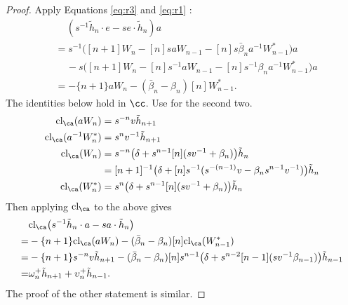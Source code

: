 \begin{proof}
Apply Equations \eqref{eq:r3} and \eqref{eq:r1} :
\begin{align*}
& \quad \, ( s^{-1} \tilde{h}_n \cdot e - s e \cdot \tilde{h}_n ) a \\
&=  s^{-1} \big( [n+1] W_n - [n] s a W_{n-1} - [n] s \bar{\beta}_n a^{-1} W^*_{n-1} \big) a \\
&\quad \, - s \big( [n+1] W_n - [n] s^{-1} a W_{n-1} - [n] s^{-1} \beta_n a^{-1} W^*_{n-1} \big) a \\
&= - \{n+1\} a W_n - ( \bar{\beta}_n - \beta_n ) [n] W^*_{n-1}.
\end{align*}
The identities below hold in $\cc$. Use \cite[Lemma 21]{She16} for the second two.
\begin{align*}
\textrm{cl}_\ca ( a W_n ) &= s^{-n} v \tilde{h}_{n+1} \\
\textrm{cl}_\ca ( a^{-1} W^*_n ) &= s^n v^{-1} \tilde{h}_{n+1} \\
\textrm{cl}_\ca ( W_n ) &= s^{-n} \big( \delta + s^{n-1} [n] ( s v^{-1} + \beta_n ) \big) \tilde{h}_n \\
&= [n+1]^{-1} \big( \delta + [n]s^{-1} ( s^{-(n-1)} v - \beta_n s^{n-1} v^{-1} ) \big) \tilde{h}_n \\
\textrm{cl}_\ca ( W^*_n ) &= s^n \big( \delta + s^{n-1} [n] ( s v^{-1} + \beta_n ) \big) \tilde{h}_n
\end{align*}
Then applying $\textrm{cl}_\ca$ to the above gives
\begin{align*} 
& \textrm{cl}_\ca \big( s^{-1} \tilde{h}_n \cdot a - s a \cdot \tilde{h}_n \big) \\
=& - \{n+1\} \textrm{cl}_\ca ( a W_n ) - ( \bar{\beta}_n - \beta_n ) [n] \textrm{cl}_\ca ( W^*_{n-1} ) \\
= & - \{n+1\} s^{-n} v \tilde{h}_{n+1} - ( \bar{\beta}_n - \beta_n ) [n] s^{n-1} \big( \delta + s^{n-2} [n-1] ( s v^{-1} \beta_{n-1} ) \big) \tilde{h}_{n-1} \\
= & \omega_n^+ \tilde{h}_{n+1} + \upsilon_n^+ \tilde{h}_{n-1}.
\end{align*}
The proof of the other statement is similar. 
\end{proof}

